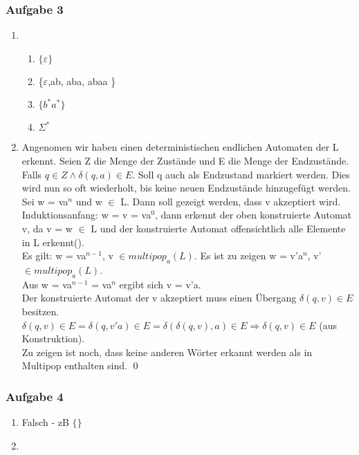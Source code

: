 \documentclass[12pt]{scrartcl}
\begin{document}
\subsubsection{Aufgabe 3}
	\begin{enumerate}
		\item 
		\begin{enumerate}
			\item \(\{\varepsilon\}\)
			\item \{$\varepsilon$,ab, aba, abaa \}
			\item \(\{ b^{*}a^{*}\}\)
			\item \( \Sigma^{*}\)
		\end{enumerate}
		\item Angenomen wir haben einen deterministischen endlichen Automaten der L erkennt. Seien Z die Menge der Zustände und E die Menge der Endzustände. Falls \( q \in Z \land \delta(q,a) \in E  \). Soll q auch als Endzustand markiert werden. Dies wird nun so oft wiederholt, bis keine neuen Endzustände hinzugefügt werden.\\
		Sei w = va$^{n}$ und w $\in$ L.  Dann soll gezeigt werden, dass v akzeptiert wird.  \\ 
		
		Induktionsanfang: w = v = va$^{0}$, dann erkennt der oben konstruierte Automat v, da v = w $\in$ L und der konstruierte Automat offensichtlich alle Elemente in L erkennt().\\ 
		
		Es gilt: w = va$^{n-1}$, v \(\in multipop_a(L)\). Es ist zu zeigen w = v'a$^{n}$, v'\(\in multipop_a(L)\). \\ 
		Aus w = va$^{n-1}$ = va$^{n}$ ergibt sich v = v'a. \\ Der konstruierte Automat der v akzeptiert muss einen Übergang \( \delta(q, v) \in E \) besitzen. \(\delta(q, v) \in E =\delta(q, v'a) \in E = \delta(\delta(q,v), a) \in E \Rightarrow \delta(q,v) \in E\) (aus Konstruktion).\\
		
		Zu zeigen ist noch, dass keine anderen Wörter erkannt werden als in Multipop enthalten sind.
		\qed	
	\end{enumerate}

\subsubsection{Aufgabe 4}
	\begin{enumerate}
		\item Falsch - zB \(\{  \}\)
		\item 
	\end{enumerate}
\end{document}

